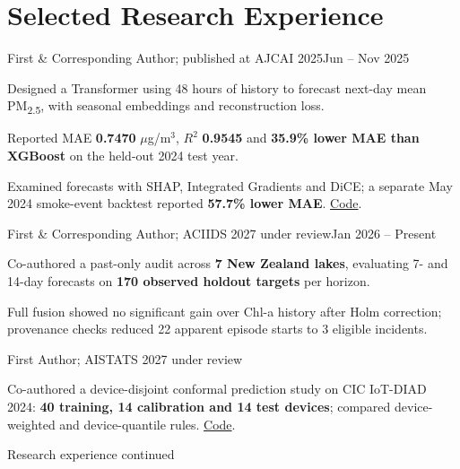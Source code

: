 \documentclass[11pt,a4paper]{article}
\begin{document}
\section{Selected Research Experience}
{First \& Corresponding Author; published at AJCAI 2025}{Jun -- Nov 2025}
\begin{highlights}
\item Designed a Transformer using 48 hours of history to forecast next-day mean PM\textsubscript{2.5}, with seasonal embeddings and reconstruction loss.
\item Reported MAE \textbf{0.7470} $\mu$g/m$^3$, $R^2$ \textbf{0.9545} and \textbf{35.9\% lower MAE than XGBoost} on the held-out 2024 test year.
\item Examined forecasts with SHAP, Integrated Gradients and DiCE; a separate May 2024 smoke-event backtest reported \textbf{57.7\% lower MAE}. \href{https://github.com/SpeedyLabX/melbourne-air-quality-forecast}{Code}.
\end{highlights}

{First \& Corresponding Author; ACIIDS 2027 under review}{Jan 2026 -- Present}
\begin{highlights}
\item Co-authored a past-only audit across \textbf{7 New Zealand lakes}, evaluating 7- and 14-day forecasts on \textbf{170 observed holdout targets} per horizon.
\item Full fusion showed no significant gain over Chl-a history after Holm correction; provenance checks reduced 22 apparent episode starts to 3 eligible incidents.
\end{highlights}

{First Author; AISTATS 2027 under review}{}
\begin{highlights}
\item Co-authored a device-disjoint conformal prediction study on CIC IoT-DIAD 2024: \textbf{40 training, 14 calibration and 14 test devices}; compared device-weighted and device-quantile rules. \href{https://github.com/SpeedyLabX/iot-diad-device-held-out}{Code}.
\end{highlights}

\newpage
{\small\textcolor{Muted}{Research experience continued}}\par\vspace{5pt}
\end{document}
